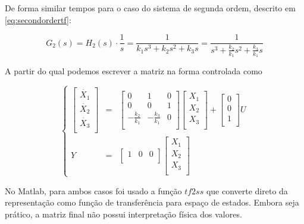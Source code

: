 \documentclass[a4paper,11pt]{article}
\begin{document}
De forma similar tempos para o caso do sistema de segunda ordem, descrito em \ref{eq:secondordertf}:

$$
G_2(s) = H_2(s)\cdot \frac{1}{s} = \frac{1}{k_1 s^3 + k_2 s^2 + k_3 s} = \frac{1}{s^3 + \frac{k_2}{k_1} s^2 + \frac{k_3}{k_1} s}
$$

A partir do qual podemos escrever a matriz na forma controlada como

\begin{equation}
\left\{
\begin{array}{rcl}
\left[\begin{array}{c}
    \dot{X_1} \\
    \dot{X_2} \\
    \dot{X_3} \\
\end{array}
\right]
&
=
&
\left[
\begin{array}{ccc}
    0 & 1 & 0 \\
    0 & 0 & 1 \\
    -\frac{k_2}{k_1} & -\frac{k_3}{k_1} & 0 \\ 
\end{array}
\right]
\left[\begin{array}{c}
    X_1 \\
    X_2 \\
    X_3 \\
\end{array}
\right]
+
\left[\begin{array}{c}
    0 \\
    0 \\
    1 \\
\end{array}
\right]
U\\
Y & = &\left[
\begin{array}{ccc}
    1 & 0 & 0 \\
\end{array}
\right]
\left[\begin{array}{c}
    X_1 \\
    X_2 \\
    X_3 \\
\end{array}
\right]
\end{array}
\right.
\end{equation}

No Matlab, para ambos casos foi usado a função $tf2ss$ que converte direto da representação como função de transferência para espaço de estados. Embora seja prático, a matriz final não possui interpretação física dos valores.
\end{document}
